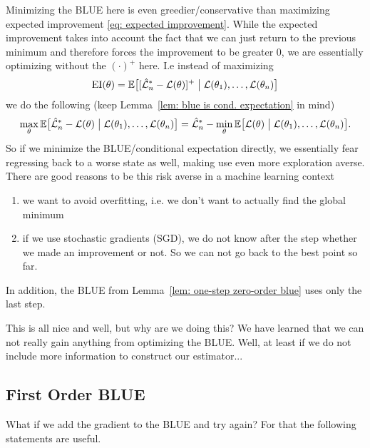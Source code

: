 Minimizing the BLUE here is even greedier/conservative than maximizing
expected improvement \eqref{eq: expected improvement}. While the expected
improvement takes into account the fact that we can just return to the previous
minimum and therefore forces the improvement to be greater \(0\), we are
essentially optimizing without the \((\cdot)^+\) here. I.e instead of
maximizing
\begin{equation*}
	\operatorname{EI}(\theta) = \mathbb{E}\big[
			[\hat{\mathcal{L}}_n^*- \mathcal{L}(\theta)]^+
			\bigm|
			\mathcal{L}(\theta_1),\dots, \mathcal{L}(\theta_n)
		\big]
\end{equation*}
we do the following (keep Lemma~\ref{lem: blue is cond. expectation} in mind)
\begin{equation*}
	\max_{\theta} \mathbb{E}\big[
		\hat{\mathcal{L}}_n^*- \mathcal{L}(\theta)
		\bigm|
		\mathcal{L}(\theta_1),\dots, \mathcal{L}(\theta_n)
	\big]
	= \hat{\mathcal{L}}_n^* - \min_{\theta} \mathbb{E}\big[
		\mathcal{L}(\theta)
		\bigm|
		\mathcal{L}(\theta_1),\dots, \mathcal{L}(\theta_n)
	\big].
\end{equation*}
So if we minimize the BLUE/conditional expectation directly, we essentially fear
regressing back to a worse state as well, making use even more exploration
averse. There are good reasons to be this risk averse in a machine learning
context
\begin{enumerate}
	\item we want to avoid overfitting, i.e. we don't want to actually find the
	global minimum
	\item if we use stochastic gradients (SGD), we do not know after the step
	whether we made an improvement or not. So we can not go back to the best
	point so far.
\end{enumerate}
In addition, the BLUE from Lemma~\ref{lem: one-step zero-order blue}
uses only the last step.

This is all nice and well, but why are we doing this? We have learned that we
can not really gain anything from optimizing the BLUE. Well, at least if we do
not include more information to construct our estimator...

\subsection{First Order BLUE}

What if we add the gradient to the BLUE and try again?
For that the following
statements are useful.
\begin{lemma}
	\label{lem: covariance of derivative}
	
\end{lemma}


